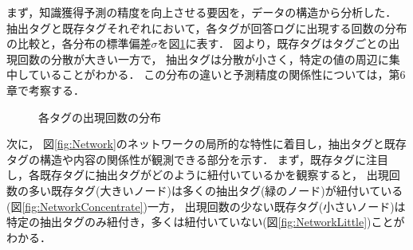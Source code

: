 まず，知識獲得予測の精度を向上させる要因を，データの構造から分析した．
抽出タグと既存タグそれぞれにおいて，各タグが回答ログに出現する回数の分布の比較と，各分布の標準偏差$\sigma$を図\ref{fig:AppearHist}に表す．
図より，既存タグはタグごとの出現回数の分散が大きい一方で，
抽出タグは分散が小さく，特定の値の周辺に集中していることがわかる．
この分布の違いと予測精度の関係性については，第6章で考察する．


\begin{figure}[htb]
\begin{center}
\hspace*{-20pt}
\end{center}
\caption{各タグの出現回数の分布}
\label{fig:AppearHist}
\end{figure}


次に，
図\ref{fig:Network}のネットワークの局所的な特性に着目し，抽出タグと既存タグの構造や内容の関係性が観測できる部分を示す．
まず，既存タグに注目し，各既存タグに抽出タグがどのように紐付いているかを観察すると，
出現回数の多い既存タグ(大きいノード)は多くの抽出タグ(緑のノード)が紐付いている(図\ref{fig:NetworkConcentrate})一方，
出現回数の少ない既存タグ(小さいノード)は特定の抽出タグのみ紐付き，多くは紐付いていない(図\ref{fig:NetworkLittle})ことがわかる．

